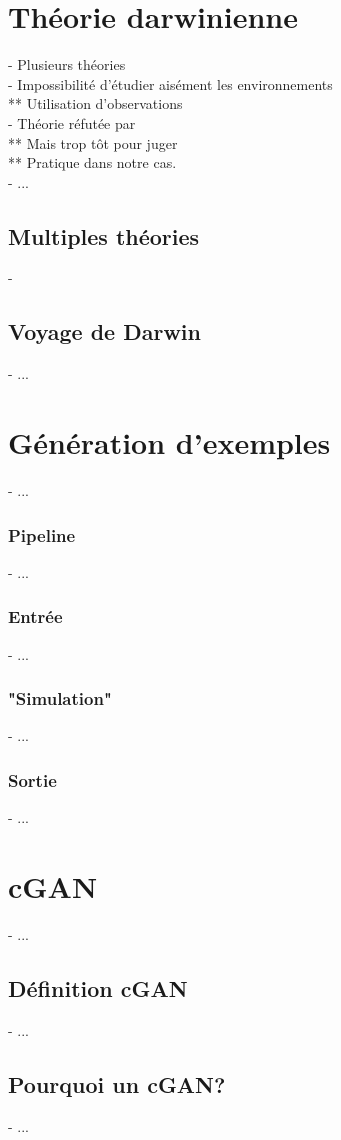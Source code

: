 \section{Théorie darwinienne}
- Plusieurs théories \\
- Impossibilité d'étudier aisément les environnements \\
** Utilisation d'observations \\
- Théorie réfutée par \cite{Droxler2021} \\
** Mais trop tôt pour juger \\
** Pratique dans notre cas. \\
- ...

\subsection{Multiples théories}
- 

\subsection{Voyage de Darwin}
- ...
\section{Génération d'exemples}
- ...
\subsubsection{Pipeline}
- ...
\subsubsection{Entrée}
- ...
\subsubsection{"Simulation"}
- ...
\subsubsection{Sortie}
- ...
\section{cGAN}
- ...
\subsection{Définition cGAN}
- ...
\subsection{Pourquoi un cGAN?}
- ...
